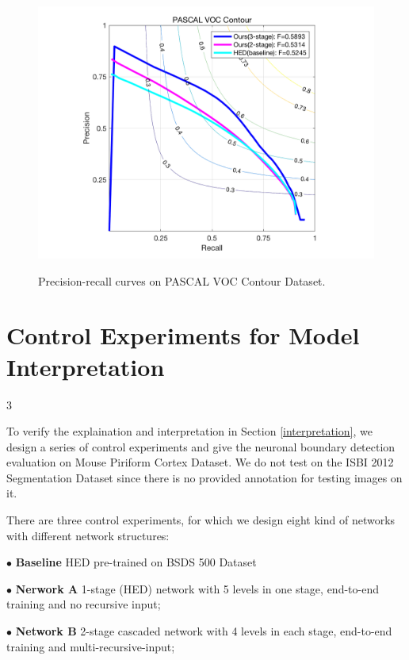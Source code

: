 \documentclass[senior]{IPSstyle}
\begin{document}
\begin{figure}[t]
  \centering
  \includegraphics[width=15cm]{voc_prcurve.png}\\
  \caption{Precision-recall curves on PASCAL VOC Contour Dataset\cite{Yang2016}.}\label{voc prcurve}
\end{figure}

\section{Control Experiments for Model Interpretation}3

To verify the explaination and interpretation in Section \ref{interpretation}, we design a series of control experiments and give the neuronal boundary detection evaluation on Mouse Piriform Cortex Dataset\cite{Lee2015}. We do not test on the ISBI 2012 Segmentation Dataset\cite{Ronneberger2015} since there is no provided annotation for testing images on it. 

There are three control experiments, for which we design eight kind of networks with different network structures:

$\bullet$ \textbf{Baseline} HED\cite{Xie2015} pre-trained on BSDS 500 Dataset\cite{Arbelaez2011}

$\bullet$ \textbf{Nerwork A} 1-stage (HED\cite{Xie2015}) network with 5 levels in one stage, end-to-end training and no recursive input;

$\bullet$ \textbf{Network B} 2-stage cascaded network with 4 levels in each stage, end-to-end training and multi-recursive-input;
\end{document}
